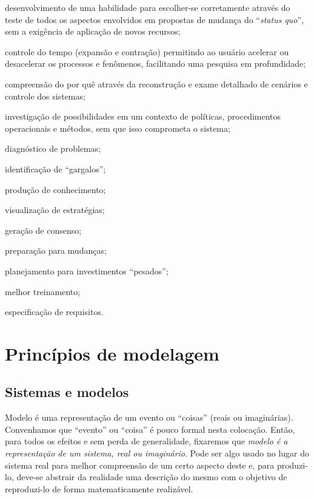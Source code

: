 \documentclass[a4paper,12pt,oneside,onecolumn]{uerj}
\begin{document}
\begin{lcircp}
    \item desenvolvimento de uma habilidade para escolher-se corretamente através do teste de todos os aspectos envolvidos em propostas de mudança do ``\emph{status quo}'', sem a exigência de aplicação de novos recursos;
    \item controle do tempo (expansão e contração) permitindo ao usuário acelerar ou desacelerar os processos e fenômenos, facilitando uma pesquisa em profundidade;
    \item compreensão do por quê através da reconstrução e exame detalhado de cenários e controle dos sistemas;
    \item investigação de possibilidades em um contexto de políticas, procedimentos operacionais e métodos, sem que isso comprometa o sistema;
    \item diagnóstico de problemas;
    \item identificação de ``gargalos'';
    \item produção de conhecimento;
    \item visualização de estratégias;
    \item geração de consenso;
    \item preparação para mudanças;
    \item planejamento para investimentos ``pesados'';
    \item melhor treinamento;
    \item especificação de requisitos.
\end{lcircp}

\chapter{Princípios de modelagem}

\section{Sistemas e modelos}

Modelo é uma representação de um evento ou ``coisas'' (reais ou imaginárias). Convenhamos que ``evento'' ou ``coisa'' é pouco formal nesta colocação. Então, para todos os efeitos e sem perda de generalidade, fixaremos que \emph{modelo é a representação de um sistema, real ou imaginário}. Pode ser algo usado no lugar do sistema real para melhor compreensão de um certo aspecto deste e, para produzi-lo, deve-se abstrair da realidade uma descrição do mesmo com o objetivo de reproduzi-lo de forma matematicamente realizável. 
\end{document}
